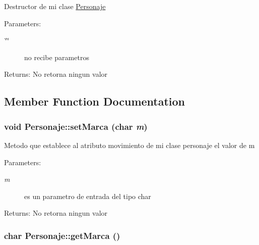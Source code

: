 Destructor de mi clase \hyperlink{classPersonaje}{Personaje} \begin{Desc}
\item[Parameters:]
\begin{description}
\item[{\em \char`\"{}\char`\"{}}]no recibe parametros \end{description}
\end{Desc}
\begin{Desc}
\item[Returns:]No retorna ningun valor \end{Desc}


\subsection{Member Function Documentation}
\hypertarget{classPersonaje_475630fe753b7fb80a2472c558d99169}{
\subsubsection[setMarca]{\setlength{\rightskip}{0pt plus 5cm}void Personaje::setMarca (char {\em m})}}
\label{classPersonaje_475630fe753b7fb80a2472c558d99169}


Metodo que establece al atributo movimiento de mi clase personaje el valor de m \begin{Desc}
\item[Parameters:]
\begin{description}
\item[{\em m}]es un parametro de entrada del tipo char \end{description}
\end{Desc}
\begin{Desc}
\item[Returns:]No retorna ningun valor \end{Desc}
\hypertarget{classPersonaje_36e1ba57799adb58163bec5a4f0015e0}{
\subsubsection[getMarca]{\setlength{\rightskip}{0pt plus 5cm}char Personaje::getMarca ()}}
\label{classPersonaje_36e1ba57799adb58163bec5a4f0015e0}


